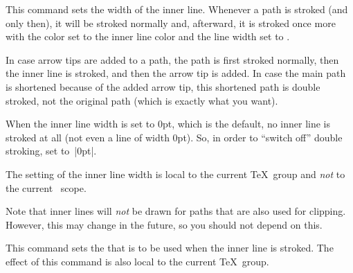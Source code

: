 \begin{command}{\pgfsetinnerlinewidth{}}
    This command sets the width of the inner line. Whenever a path is stroked
    (and only then), it will be stroked normally and, afterward, it is stroked
    once more with the color set to the inner line color and the line width set
    to .

    In case arrow tips are added to a path, the path is first stroked normally,
    then the inner line is stroked, and then the arrow tip is added. In case
    the main path is shortened because of the added arrow tip, this shortened
    path is double stroked, not the original path (which is exactly what you
    want).

    When the inner line width is set to 0pt, which is the default, no inner
    line is stroked at all (not even a line of width 0pt). So, in order to
    ``switch off'' double stroking, set  to~|0pt|.

    The setting of the inner line width is local to the current \TeX\ group and
    \emph{not} to the current \pgfname\ scope.

    Note that inner lines will \emph{not} be drawn for paths that are also used
    for clipping. However, this may change in the future, so you should not
    depend on this.
\begin{codeexample}[]
\begin{pgfpicture}
  \pgfpathmoveto{\pgfpointorigin}
  \pgfpathlineto{\pgfpoint{1cm}{1cm}}
  \pgfpathlineto{\pgfpoint{1cm}{0cm}}
  \pgfsetlinewidth{2pt}
  \pgfsetinnerlinewidth{1pt}
\end{pgfpicture}
\end{codeexample}
\end{command}

\begin{command}{\pgfsetinnerstrokecolor{}}
    This command sets the  that is to be used when the inner line
    is stroked. The effect of this command is also local to the current \TeX\
    group.
\begin{codeexample}[]
\begin{pgfpicture}
  \pgfpathmoveto{\pgfpointorigin}
  \pgfpathlineto{\pgfpoint{1cm}{1cm}}
  \pgfpathlineto{\pgfpoint{1cm}{0cm}}
  \pgfsetlinewidth{2pt}
  \pgfsetinnerlinewidth{1pt}
\end{pgfpicture}
\end{codeexample}
\end{command}


